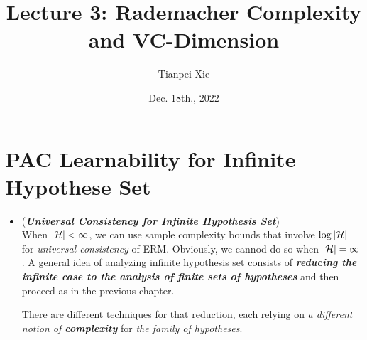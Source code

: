\documentclass[11pt]{article}
\begin{document}
\title{Lecture 3: Rademacher Complexity and VC-Dimension}
\author{ Tianpei Xie}
\date{ Dec. 18th., 2022 }
\maketitle
\tableofcontents
\newpage
\section{PAC Learnability for Infinite Hypothese Set}
\begin{itemize}
\item \begin{remark} (\emph{\textbf{Universal Consistency for Infinite Hypothesis Set}})\\
When $\left\lvert {\mathcal H} \right\rvert < \infty$, we can use sample complexity bounds that involve $\log \left\lvert {\mathcal H} \right\rvert$ for \emph{universal consistency} of ERM. Obviously, we cannod do so when $\left\lvert {\mathcal H} \right\rvert = \infty$. A general idea of analyzing infinite hypothesis set consists of \emph{\textbf{reducing the infinite case to the analysis of finite sets of hypotheses}} and then proceed as in the previous chapter. 

There are different techniques for that reduction, each relying on \emph{a different notion of \textbf{complexity}} for \emph{the family of hypotheses}. 
\end{remark}
\end{itemize}
\end{document}
